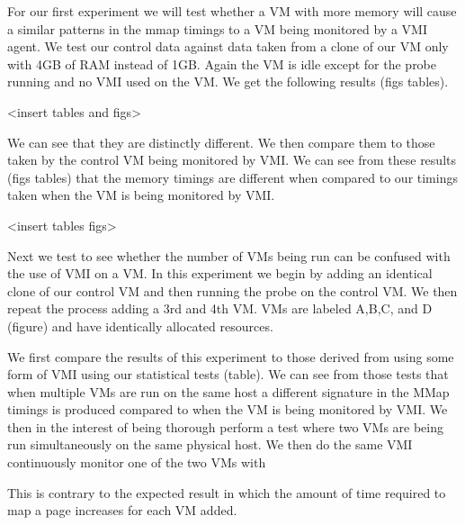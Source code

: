 For our first experiment we will test whether a VM with more memory will cause a similar patterns in the mmap timings to a VM  being monitored by a VMI agent. We test our control data against data taken from a clone of our VM only with 4GB of RAM instead of 1GB. Again the VM is idle except for the probe running and no VMI used on the VM. We get the following results (figs tables). 

<insert tables and figs>


We can see that they are distinctly different. We then compare them to those taken by the control VM being monitored by VMI. We can see from these results (figs tables) that the memory timings are different when compared to our timings taken when the VM is being monitored by VMI.

<insert tables figs> 


Next we test to see whether the number of VMs being run can be confused with the use of VMI on a VM. In this experiment we begin by adding an identical clone of our control VM and then running the probe on the control VM. We then repeat the process adding a 3rd and 4th VM. VMs are labeled A,B,C, and D (figure) and have identically allocated resources. 

We first compare the results of this experiment to those derived from using some form of VMI using our statistical tests (table). We can see from those tests that when multiple VMs are run on the same host a different signature in the MMap timings is produced compared to when the VM is being monitored by VMI.  We then in the interest of being thorough perform a test where two VMs are being run simultaneously on the same physical host. We then do the same VMI continuously monitor one of the two VMs with 

This is contrary to the expected result in which the amount of time required to map a page increases for each VM added. 